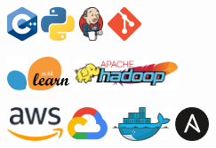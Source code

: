 {\centering
	
	\divider


}

\bigskip
{}

\bigskip
{}
{\centering
		\includegraphics[height=10mm]{img/cpp.png}
		\includegraphics[height=10mm]{img/python.png}
		\includegraphics[height=10mm]{img/jenkins.png}
		\includegraphics[height=10mm]{img/git.png}

		\divider

		\includegraphics[height=10mm]{img/scikit.png}
		\includegraphics[height=10mm]{img/hadoop.png}

}

\bigskip
{}
{\centering
	\includegraphics[height=10mm]{img/aws.png}
	\includegraphics[height=10mm]{img/gcp.png}
	\includegraphics[height=10mm]{img/docker.png}
	\includegraphics[height=10mm]{img/ansible.png} 

	
}